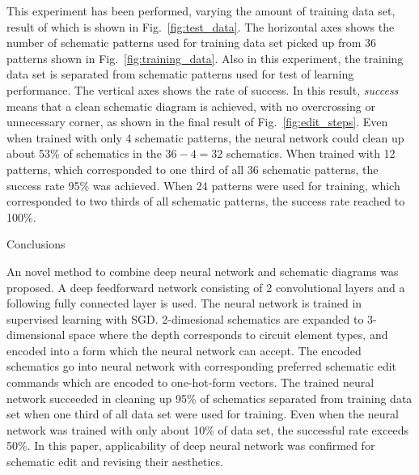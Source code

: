 \documentclass[twocolumn]{article}
\makeatletter
\def\section{\@startsection {section}{1}{\z@}{20pt plus 2pt minus 2pt}
{8pt plus 2pt minus 2pt}{\centering\normalsize\sc
\edef\@svsec{\thesection.\ }}}
\def\thesection{\Roman{section}}
\makeatother
\begin{document}
This experiment has been performed, varying the amount of training data set,
result of which is shown in Fig.\ \ref{fig:test_data}.
The horizontal axes shows the number of schematic patterns
used for training data set picked up from 36 patterns
shown in Fig.\ \ref{fig:training_data}.
Also in this experiment,
the training data set is separated from schematic patterns
used for test of learning performance.
The vertical axes shows the rate of success.
In this result, {\it success} means that a clean schematic diagram is achieved,
with no overcrossing or unnecessary corner,
as shown in the final result of Fig.\ \ref{fig:edit_steps}.
Even when trained with only 4 schematic patterns,
the neural network could clean up about 53\% of schematics
in the $36 - 4 = 32$ schematics.
When trained with 12 patterns,
which corresponded to one third of all 36 schematic patterns,
the success rate 95\% was achieved.
When 24 patterns were used for training,
which corresponded to two thirds of all schematic patterns,
the success rate reached to 100\%.

\section{Conclusions}

An novel method to combine deep neural network and schematic diagrams
was proposed.
A deep feedforward network consisting of 2 convolutional layers
and a following fully connected layer is used.
The neural network is trained in supervised learning with SGD.
2-dimesional schematics are expanded to 3-dimensional space
where the depth corresponds to circuit element types,
and encoded into a form which the neural network can accept.
The encoded schematics go into neural network with corresponding
preferred schematic edit commands which are encoded to one-hot-form vectors.
The trained neural network succeeded in cleaning up 95\% of schematics
separated from training data set when one third of all data set were used
for training.
Even when the neural network was trained with only about 10\% of data set,
the successful rate exceeds 50\%.
In this paper,
applicability of deep neural network was confirmed
for schematic edit and revising their aesthetics.

\end{document}
